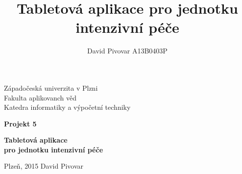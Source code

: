 \documentclass[12pt, a4paper]{report}
\title{Tabletová aplikace pro jednotku intenzivní péče}
\author{David Pivovar A13B0403P}
\begin{document}
\begin{titlepage}

\begin{center}
	
	{\fontsize{22}{0} \selectfont
		Západočeská univerzita v Plzni\\
		Fakulta aplikovanch věd\\
		Katedra informatiky a výpočetní techniky\\
	}
	
	\vfill
	\vfill
	
	{\fontsize{28}{0} \textbf{
		Projekt 5\\
	}}
	
	\vfill
	
	{\fontsize{36}{0} \textbf{
		Tabletová aplikace\\pro jednotku intenzivní péče
	}}

\end{center}

\vfill
\vfill
\vfill
\vfill

\begin{flushleft}

	{\fontsize{16}{0} \selectfont
		Plzeň, 2015
		\hfill
		David Pivovar
	}
	
\end{flushleft}

\end{titlepage}


\tableofcontents






%
%
%


\end{document}
